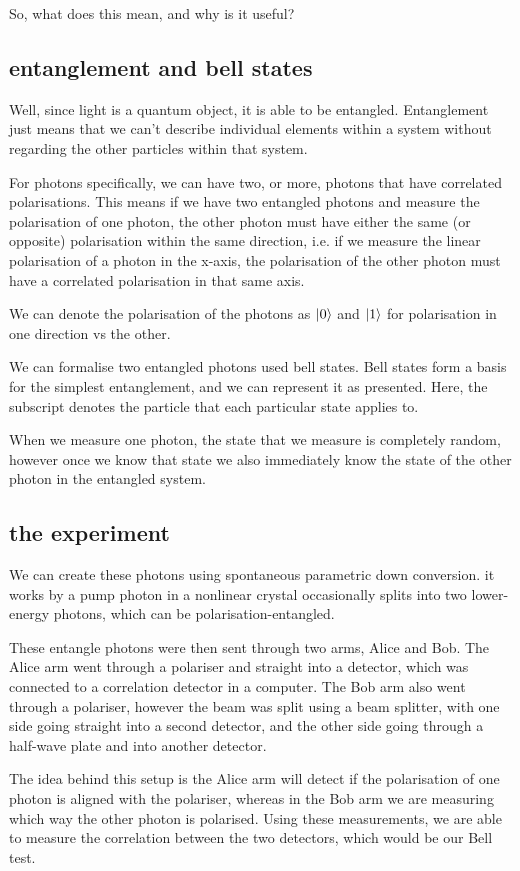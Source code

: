 \documentclass{article}
\begin{document}
So, what does this mean, and why is it useful?

\subsection{entanglement and bell states}
Well, since light is a quantum object, it is able to be entangled. Entanglement just means that we can't describe individual elements within a system without regarding the other particles within that system.

For photons specifically, we can have two, or more, photons that have correlated polarisations. This means if we have two entangled photons and measure the polarisation of one photon, the other photon must have either the same (or opposite) polarisation within the same direction, i.e. if we measure the linear polarisation of a photon in the x-axis, the polarisation of the other photon must have a correlated polarisation in that same axis.

We can denote the polarisation of the photons as $\ket{0}$ and $\ket{1}$ for polarisation in one direction vs the other.

We can formalise two entangled photons used bell states. Bell states form a basis for the simplest entanglement, and we can represent it as presented. Here, the subscript denotes the particle that each particular state applies to.

When we measure one photon, the state that we measure is completely random, however once we know that state we also immediately know the state of the other photon in the entangled system.

\subsection{the experiment}
We can create these photons using spontaneous parametric down conversion. it works by a pump photon in a nonlinear crystal occasionally splits into two lower-energy photons, which can be polarisation-entangled.

These entangle photons were then sent through two arms, Alice and Bob. The Alice arm went through a polariser and straight into a detector, which was connected to a correlation detector in a computer. The Bob arm also went through a polariser, however the beam was split using a beam splitter, with one side going straight into a second detector, and the other side going through a half-wave plate and into another detector.

The idea behind this setup is the Alice arm will detect if the polarisation of one photon is aligned with the polariser, whereas in the Bob arm we are measuring which way the other photon is polarised. Using these measurements, we are able to measure the correlation between the two detectors, which would be our Bell test.
\end{document}
